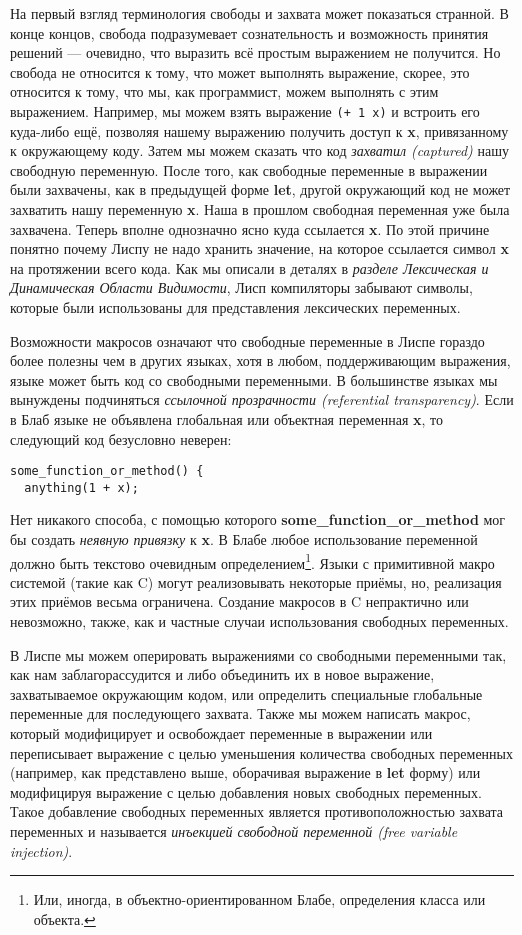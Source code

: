 На первый взгляд терминология свободы и захвата может показаться странной. В конце концов, свобода подразумевает сознательность и возможность принятия решений --- очевидно, что выразить всё простым выражением не получится. Но свобода не относится к тому, что может выполнять выражение, скорее, это относится к тому, что мы, как программист, можем выполнять с этим выражением. Например, мы можем взять выражение \verb'(+ 1 x)' и встроить его куда-либо ещё, позволяя нашему выражению получить доступ к \textbf{x}, привязанному к окружающему коду. Затем мы можем сказать что код \emph{захватил (captured)} нашу свободную переменную. После того, как свободные переменные в выражении были захвачены, как в предыдущей форме \textbf{let}, другой окружающий код не может захватить нашу переменную \textbf{x}. Наша в прошлом свободная переменная уже была захвачена. Теперь вполне однозначно ясно куда ссылается \textbf{x}. По этой причине понятно почему Лиспу не надо хранить значение, на которое ссылается символ \textbf{x} на протяжении всего кода. Как мы описали в деталях в \emph{разделе Лексическая и Динамическая Области Видимости}, Лисп компиляторы забывают символы, которые были использованы для представления лексических переменных.

Возможности макросов означают что свободные переменные в Лиспе гораздо более полезны чем в других языках, хотя в любом, поддерживающим выражения, языке может быть код со свободными переменными. В большинстве языках мы вынуждены подчиняться \emph{ссылочной прозрачности (referential transparency)}. Если в Блаб языке не объявлена глобальная или объектная переменная \textbf{x}, то следующий код безусловно неверен:

\begin{verbatim}
some_function_or_method() {
  anything(1 + x);
\end{verbatim}

Нет никакого способа, с помощью которого {\textbf{so\-me\_func\-tion\_or\_me\-thod}} мог бы создать \emph{неявную привязку} к \textbf{x}. В Блабе любое использование переменной должно быть текстово очевидным определением\footnote{Или, иногда, в объектно-ориентированном Блабе, определения класса или объекта.}. Языки с примитивной макро системой (такие как C) могут реализовывать некоторые приёмы, но, реализация этих приёмов весьма ограничена. Создание макросов в C непрактично или невозможно, также, как и частные случаи использования свободных переменных.

В Лиспе мы можем оперировать выражениями со свободными переменными так, как нам заблагорассудится и либо объединить их в новое выражение, захватываемое окружающим кодом, или определить специальные глобальные переменные для последующего захвата. Также мы можем написать макрос, который модифицирует и освобождает переменные в выражении или переписывает выражение с целью уменьшения количества свободных переменных (например, как представлено выше, оборачивая выражение в \textbf{let} форму) или модифицируя выражение с целью добавления новых свободных переменных. Такое добавление свободных переменных является противоположностью захвата переменных и называется \emph{инъекцией свободной переменной (free variable injection)}.

